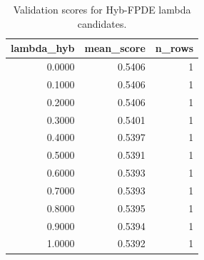 \begin{table}[t]
\caption{Validation scores for Hyb-FPDE lambda candidates.}
\label{tab:lambda_distribution_computed}
\centering
\begin{tabular}{rrr}
\toprule
lambda\_hyb & mean\_score & n\_rows \\
\midrule
0.0000 & 0.5406 & 1 \\
0.1000 & 0.5406 & 1 \\
0.2000 & 0.5406 & 1 \\
0.3000 & 0.5401 & 1 \\
0.4000 & 0.5397 & 1 \\
0.5000 & 0.5391 & 1 \\
0.6000 & 0.5393 & 1 \\
0.7000 & 0.5393 & 1 \\
0.8000 & 0.5395 & 1 \\
0.9000 & 0.5394 & 1 \\
1.0000 & 0.5392 & 1 \\
\bottomrule
\end{tabular}

\end{table}
